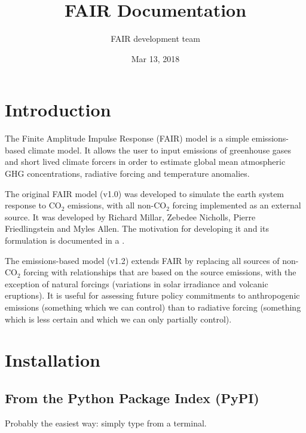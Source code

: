 \documentclass[letterpaper,10pt,english]{sphinxmanual}
\title{FAIR Documentation}
\date{Mar 13, 2018}
\author{FAIR development team}
\begin{document}
\maketitle
\sphinxtableofcontents
{}\label{\detokenize{index::doc}}



\chapter{Introduction}
\label{\detokenize{intro:introduction}}\label{\detokenize{intro:fair-finite-amplitude-impulse-response-simple-climate-model}}\label{\detokenize{intro::doc}}
The Finite Amplitude Impulse Response (FAIR) model is a simple
emissions-based climate model. It allows the user to input emissions of
greenhouse gases and short lived climate forcers in order to estimate
global mean atmospheric GHG concentrations, radiative forcing and
temperature anomalies.

The original FAIR model (v1.0) was developed to simulate the earth
system response to CO$_{\text{2}}$ emissions, with all non-CO$_{\text{2}}$ forcing implemented as an \sphinxquotedblleft{}external\sphinxquotedblright{} source. It was developed by Richard
Millar, Zebedee Nicholls, Pierre Friedlingstein and Myles Allen. The
motivation for developing it and its formulation is documented in a
.

The emissions-based model (v1.2) extends FAIR by replacing all sources of
non-CO$_{\text{2}}$ forcing with relationships that are based on the
source emissions, with the exception of natural forcings (variations
in solar irradiance and volcanic eruptions). It is useful for
assessing future policy commitments to anthropogenic emissions
(something which we can control) than to radiative forcing (something
which is less certain and which we can only partially control).


\chapter{Installation}
\label{\detokenize{installation:installation}}\label{\detokenize{installation::doc}}

\section{From the Python Package Index (PyPI)}
\label{\detokenize{installation:from-the-python-package-index-pypi}}
Probably the easiest way: simply type  from a terminal.
\end{document}
